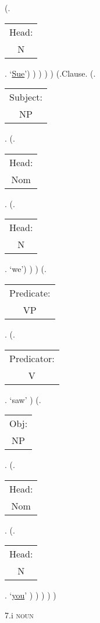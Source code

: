 \documentclass[12pt,letterpaper]{article}
\begin{document}
\begin{figure}
\begin{center}
\begin{parsetree}
		(.\begin{tabular}{c}Head:\\N\end{tabular}. `\underline{Sue}')
		)
		)
		)
		)
		(.Clause.
		(.\begin{tabular}{c}Subject:\\NP\end{tabular}.  
		(.\begin{tabular}{c}Head:\\Nom\end{tabular}.
		(.\begin{tabular}{c}Head:\\N\end{tabular}. `we')
		)
		)
		(.\begin{tabular}{c}Predicate:\\VP\end{tabular}.
		(.\begin{tabular}{c}Predicator:\\V\end{tabular}.    `saw' )
		(.\begin{tabular}{c}Obj:\\NP\end{tabular}. 
		(.\begin{tabular}{c}Head:\\Nom\end{tabular}.  
		(.\begin{tabular}{c}Head:\\N\end{tabular}.    `\underline{you}' )
		)
		)
		)
		)
		
		\hfill \break\hfill \break
	\end{parsetree}
		7.i \textsc{noun}
	\end{center}
\end{figure}
\end{document}

